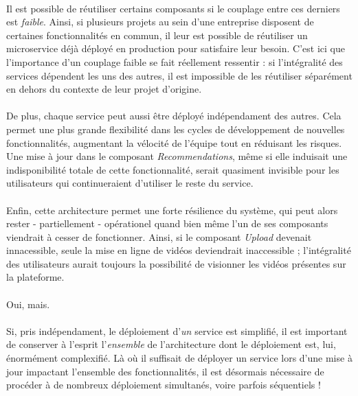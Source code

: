 \paragraph{} Il est possible de réutiliser certains composants si le couplage entre ces derniers est \emph{faible}.
Ainsi, si plusieurs projets au sein d'une entreprise disposent de certaines fonctionnalités en commun, il leur est possible 
de réutiliser un microservice déjà déployé en production pour satisfaire leur besoin. C'est ici que l'importance d'un couplage
faible se fait réellement ressentir : si l'intégralité des services dépendent les uns des autres, il est impossible de les
réutiliser séparément en dehors du contexte de leur projet d'origine.

\paragraph{} De plus, chaque service peut aussi être déployé indépendament des autres. Cela permet une plus grande flexibilité dans
les cycles de développement de nouvelles fonctionnalités, augmentant la vélocité de l'équipe tout en réduisant les risques.
Une mise à jour dans le composant \emph{Recommendations}, même si elle induisait une indisponibilité totale de cette fonctionnalité,
serait quasiment invisible pour les utilisateurs qui continueraient d'utiliser le reste du service.

\paragraph{} Enfin, cette architecture permet une forte résilience du système, qui peut alors rester - partiellement - 
opérationel quand bien même l'un de ses composants viendrait à cesser de fonctionner. Ainsi, si le composant \emph{Upload}
devenait innacessible, seule la mise en ligne de vidéos deviendrait inaccessible ; l'intégralité des utilisateurs aurait
toujours la possibilité de visionner les vidéos présentes sur la plateforme.

\paragraph{} Oui, mais.

\paragraph{} Si, pris indépendament, le déploiement d'\emph{un} service est simplifié, il est important de conserver
à l'esprit l'\emph{ensemble} de l'architecture dont le déploiement est, lui, énormément complexifié. Là où il suffisait de 
déployer un service lors d'une mise à jour impactant l'ensemble des fonctionnalités, il est désormais nécessaire de procéder 
à de nombreux déploiement simultanés, voire parfois séquentiels !

